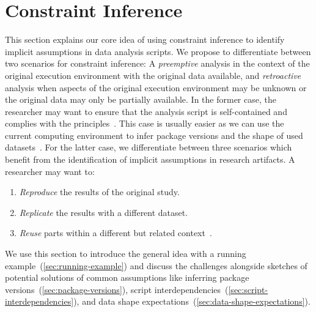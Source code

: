 \def\sparagraph#1{\vspace{3pt}\par\smash{\raisebox{1pt}{\large\textbullet}}~\textit{#1.}~~\ignorespaces}
\section{Constraint Inference}\label{sec:overview}
This section explains our core idea of using constraint inference to identify implicit assumptions in data analysis scripts.
We propose to differentiate between two scenarios for constraint inference: A \textit{preemptive} analysis in the context of the original execution environment with the original data available, and \textit{retroactive} analysis when aspects of the original execution environment may be unknown or the original data may only be partially available.
In the former case, the researcher may want to ensure that the analysis script is self-contained and complies with the \FAIR principles~\cite{Wilkinson2016}. This case is usually easier as we can use the current computing environment to infer package versions and the shape of used datasets~\cite{donat2025r4r}.
For the latter case, we differentiate between three scenarios which benefit from the identification of implicit assumptions in research artifacts. A researcher may want to:
\begin{enumerate}[nosep]
  \item \textit{Reproduce} the results of the original study. %
  \item \textit{Replicate} the results with a different dataset. %
  \item \textit{Reuse} parts within a different but related context~\cite{Wilkinson2016}. %
\end{enumerate}
We use this section to introduce the general idea with a running example~(\ref{sec:running-example}) and discuss the challenges alongside sketches of potential solutions of common assumptions like inferring package versions~(\ref{sec:package-versions}), script interdependencies~(\ref{sec:script-interdependencies}), and data shape expectations~(\ref{sec:data-shape-expectations}). %
